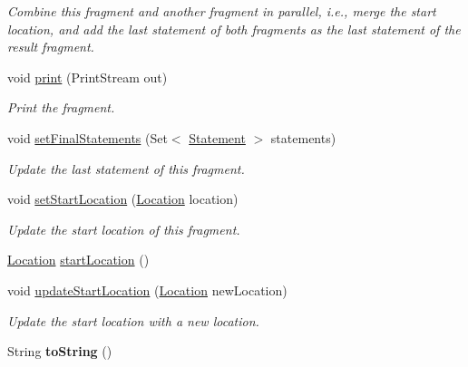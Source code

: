 \begin{DoxyCompactItemize}
\begin{DoxyCompactList}\small\item\em Combine this fragment and another fragment in parallel, i.\+e., merge the start location, and add the last statement of both fragments as the last statement of the result fragment. \end{DoxyCompactList}\item 
void \hyperlink{classedu_1_1udel_1_1cis_1_1vsl_1_1civl_1_1model_1_1common_1_1CommonFragment_a94d7066496470cc5d1a7b21b5b73fc9f}{print} (Print\+Stream out)
\begin{DoxyCompactList}\small\item\em Print the fragment. \end{DoxyCompactList}\item 
void \hyperlink{classedu_1_1udel_1_1cis_1_1vsl_1_1civl_1_1model_1_1common_1_1CommonFragment_a952bc55d485c5bd29766d1e067d7994a}{set\+Final\+Statements} (Set$<$ \hyperlink{interfaceedu_1_1udel_1_1cis_1_1vsl_1_1civl_1_1model_1_1IF_1_1statement_1_1Statement}{Statement} $>$ statements)
\begin{DoxyCompactList}\small\item\em Update the last statement of this fragment. \end{DoxyCompactList}\item 
void \hyperlink{classedu_1_1udel_1_1cis_1_1vsl_1_1civl_1_1model_1_1common_1_1CommonFragment_ab978a4e9d9ae890f31e9088a3c5912e1}{set\+Start\+Location} (\hyperlink{interfaceedu_1_1udel_1_1cis_1_1vsl_1_1civl_1_1model_1_1IF_1_1location_1_1Location}{Location} location)
\begin{DoxyCompactList}\small\item\em Update the start location of this fragment. \end{DoxyCompactList}\item 
\hyperlink{interfaceedu_1_1udel_1_1cis_1_1vsl_1_1civl_1_1model_1_1IF_1_1location_1_1Location}{Location} \hyperlink{classedu_1_1udel_1_1cis_1_1vsl_1_1civl_1_1model_1_1common_1_1CommonFragment_a0fbcc137c61bca4873a973a1491d9ed5}{start\+Location} ()
\item 
void \hyperlink{classedu_1_1udel_1_1cis_1_1vsl_1_1civl_1_1model_1_1common_1_1CommonFragment_a030d5185dc9f8e58ce5219076b873a9b}{update\+Start\+Location} (\hyperlink{interfaceedu_1_1udel_1_1cis_1_1vsl_1_1civl_1_1model_1_1IF_1_1location_1_1Location}{Location} new\+Location)
\begin{DoxyCompactList}\small\item\em Update the start location with a new location. \end{DoxyCompactList}\item 
\hypertarget{classedu_1_1udel_1_1cis_1_1vsl_1_1civl_1_1model_1_1common_1_1CommonFragment_a2de6f558c0dc5932076992c081100667}{}String {\bfseries to\+String} ()\label{classedu_1_1udel_1_1cis_1_1vsl_1_1civl_1_1model_1_1common_1_1CommonFragment_a2de6f558c0dc5932076992c081100667}


\end{DoxyCompactItemize}
